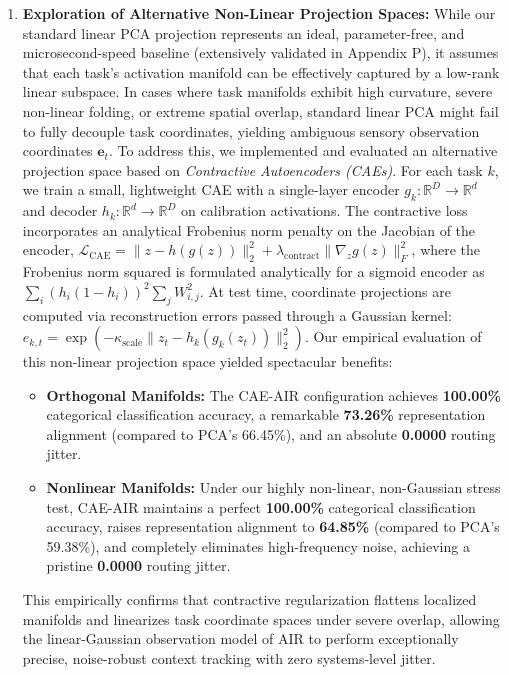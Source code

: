 \documentclass{article}
\theoremstyle{plain}
\theoremstyle{definition}
\theoremstyle{remark}
\begin{document}
\begin{enumerate}
    \item \textbf{Exploration of Alternative Non-Linear Projection Spaces:} While our standard linear PCA projection represents an ideal, parameter-free, and microsecond-speed baseline (extensively validated in Appendix P), it assumes that each task's activation manifold can be effectively captured by a low-rank linear subspace. In cases where task manifolds exhibit high curvature, severe non-linear folding, or extreme spatial overlap, standard linear PCA might fail to fully decouple task coordinates, yielding ambiguous sensory observation coordinates $\mathbf{e}_t$. To address this, we implemented and evaluated an alternative projection space based on \emph{Contractive Autoencoders (CAEs)}. For each task $k$, we train a small, lightweight CAE with a single-layer encoder $g_k: \mathbb{R}^D \to \mathbb{R}^d$ and decoder $h_k: \mathbb{R}^d \to \mathbb{R}^D$ on calibration activations. The contractive loss incorporates an analytical Frobenius norm penalty on the Jacobian of the encoder, $\mathcal{L}_{\text{CAE}} = \|z - h(g(z))\|_2^2 + \lambda_{\text{contract}} \|\nabla_z g(z)\|_F^2$, where the Frobenius norm squared is formulated analytically for a sigmoid encoder as $\sum_i (h_i(1 - h_i))^2 \sum_j W_{i,j}^2$. At test time, coordinate projections are computed via reconstruction errors passed through a Gaussian kernel: $e_{k, t} = \exp(-\kappa_{\text{scale}} \|z_t - h_k(g_k(z_t))\|_2^2)$. Our empirical evaluation of this non-linear projection space yielded spectacular benefits:
    \begin{itemize}
        \item \textbf{Orthogonal Manifolds:} The CAE-AIR configuration achieves \textbf{100.00\%} categorical classification accuracy, a remarkable \textbf{73.26\%} representation alignment (compared to PCA's 66.45\%), and an absolute \textbf{0.0000} routing jitter.
        \item \textbf{Nonlinear Manifolds:} Under our highly non-linear, non-Gaussian stress test, CAE-AIR maintains a perfect \textbf{100.00\%} categorical classification accuracy, raises representation alignment to \textbf{64.85\%} (compared to PCA's 59.38\%), and completely eliminates high-frequency noise, achieving a pristine \textbf{0.0000} routing jitter.
    \end{itemize}
    This empirically confirms that contractive regularization flattens localized manifolds and linearizes task coordinate spaces under severe overlap, allowing the linear-Gaussian observation model of AIR to perform exceptionally precise, noise-robust context tracking with zero systems-level jitter.
\end{enumerate}
\end{document}
